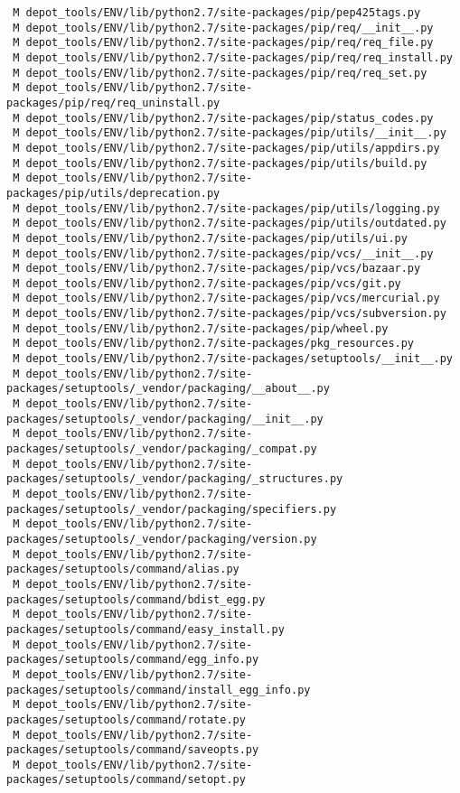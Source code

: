 \documentclass{article}
\begin{document}
\begin{verbatim}
 M depot_tools/ENV/lib/python2.7/site-packages/pip/pep425tags.py
 M depot_tools/ENV/lib/python2.7/site-packages/pip/req/__init__.py
 M depot_tools/ENV/lib/python2.7/site-packages/pip/req/req_file.py
 M depot_tools/ENV/lib/python2.7/site-packages/pip/req/req_install.py
 M depot_tools/ENV/lib/python2.7/site-packages/pip/req/req_set.py
 M depot_tools/ENV/lib/python2.7/site-packages/pip/req/req_uninstall.py
 M depot_tools/ENV/lib/python2.7/site-packages/pip/status_codes.py
 M depot_tools/ENV/lib/python2.7/site-packages/pip/utils/__init__.py
 M depot_tools/ENV/lib/python2.7/site-packages/pip/utils/appdirs.py
 M depot_tools/ENV/lib/python2.7/site-packages/pip/utils/build.py
 M depot_tools/ENV/lib/python2.7/site-packages/pip/utils/deprecation.py
 M depot_tools/ENV/lib/python2.7/site-packages/pip/utils/logging.py
 M depot_tools/ENV/lib/python2.7/site-packages/pip/utils/outdated.py
 M depot_tools/ENV/lib/python2.7/site-packages/pip/utils/ui.py
 M depot_tools/ENV/lib/python2.7/site-packages/pip/vcs/__init__.py
 M depot_tools/ENV/lib/python2.7/site-packages/pip/vcs/bazaar.py
 M depot_tools/ENV/lib/python2.7/site-packages/pip/vcs/git.py
 M depot_tools/ENV/lib/python2.7/site-packages/pip/vcs/mercurial.py
 M depot_tools/ENV/lib/python2.7/site-packages/pip/vcs/subversion.py
 M depot_tools/ENV/lib/python2.7/site-packages/pip/wheel.py
 M depot_tools/ENV/lib/python2.7/site-packages/pkg_resources.py
 M depot_tools/ENV/lib/python2.7/site-packages/setuptools/__init__.py
 M depot_tools/ENV/lib/python2.7/site-packages/setuptools/_vendor/packaging/__about__.py
 M depot_tools/ENV/lib/python2.7/site-packages/setuptools/_vendor/packaging/__init__.py
 M depot_tools/ENV/lib/python2.7/site-packages/setuptools/_vendor/packaging/_compat.py
 M depot_tools/ENV/lib/python2.7/site-packages/setuptools/_vendor/packaging/_structures.py
 M depot_tools/ENV/lib/python2.7/site-packages/setuptools/_vendor/packaging/specifiers.py
 M depot_tools/ENV/lib/python2.7/site-packages/setuptools/_vendor/packaging/version.py
 M depot_tools/ENV/lib/python2.7/site-packages/setuptools/command/alias.py
 M depot_tools/ENV/lib/python2.7/site-packages/setuptools/command/bdist_egg.py
 M depot_tools/ENV/lib/python2.7/site-packages/setuptools/command/easy_install.py
 M depot_tools/ENV/lib/python2.7/site-packages/setuptools/command/egg_info.py
 M depot_tools/ENV/lib/python2.7/site-packages/setuptools/command/install_egg_info.py
 M depot_tools/ENV/lib/python2.7/site-packages/setuptools/command/rotate.py
 M depot_tools/ENV/lib/python2.7/site-packages/setuptools/command/saveopts.py
 M depot_tools/ENV/lib/python2.7/site-packages/setuptools/command/setopt.py

\end{verbatim}
\end{document}
